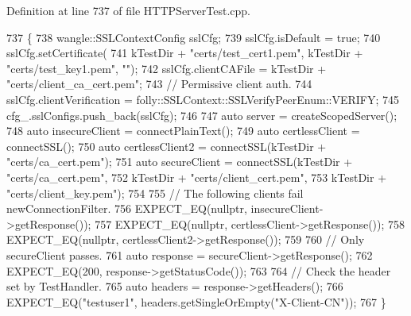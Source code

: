 Definition at line 737 of file H\+T\+T\+P\+Server\+Test.\+cpp.


\begin{DoxyCode}
737                                    \{
738   wangle::SSLContextConfig sslCfg;
739   sslCfg.isDefault = \textcolor{keyword}{true};
740   sslCfg.setCertificate(
741       kTestDir + \textcolor{stringliteral}{"certs/test\_cert1.pem"}, kTestDir + \textcolor{stringliteral}{"certs/test\_key1.pem"}, \textcolor{stringliteral}{""});
742   sslCfg.clientCAFile = kTestDir + \textcolor{stringliteral}{"certs/client\_ca\_cert.pem"};
743   \textcolor{comment}{// Permissive client auth.}
744   sslCfg.clientVerification = folly::SSLContext::SSLVerifyPeerEnum::VERIFY;
745   cfg\_.sslConfigs.push\_back(sslCfg);
746 
747   \textcolor{keyword}{auto} server = createScopedServer();
748   \textcolor{keyword}{auto} insecureClient = connectPlainText();
749   \textcolor{keyword}{auto} certlessClient = connectSSL();
750   \textcolor{keyword}{auto} certlessClient2 = connectSSL(kTestDir + \textcolor{stringliteral}{"certs/ca\_cert.pem"});
751   \textcolor{keyword}{auto} secureClient = connectSSL(kTestDir + \textcolor{stringliteral}{"certs/ca\_cert.pem"},
752                                  kTestDir + \textcolor{stringliteral}{"certs/client\_cert.pem"},
753                                  kTestDir + \textcolor{stringliteral}{"certs/client\_key.pem"});
754 
755   \textcolor{comment}{// The following clients fail newConnectionFilter.}
756   EXPECT\_EQ(\textcolor{keyword}{nullptr}, insecureClient->getResponse());
757   EXPECT\_EQ(\textcolor{keyword}{nullptr}, certlessClient->getResponse());
758   EXPECT\_EQ(\textcolor{keyword}{nullptr}, certlessClient2->getResponse());
759 
760   \textcolor{comment}{// Only secureClient passes.}
761   \textcolor{keyword}{auto} response = secureClient->getResponse();
762   EXPECT\_EQ(200, response->getStatusCode());
763 
764   \textcolor{comment}{// Check the header set by TestHandler.}
765   \textcolor{keyword}{auto} headers = response->getHeaders();
766   EXPECT\_EQ(\textcolor{stringliteral}{"testuser1"}, headers.getSingleOrEmpty(\textcolor{stringliteral}{"X-Client-CN"}));
767 \}
\end{DoxyCode}
